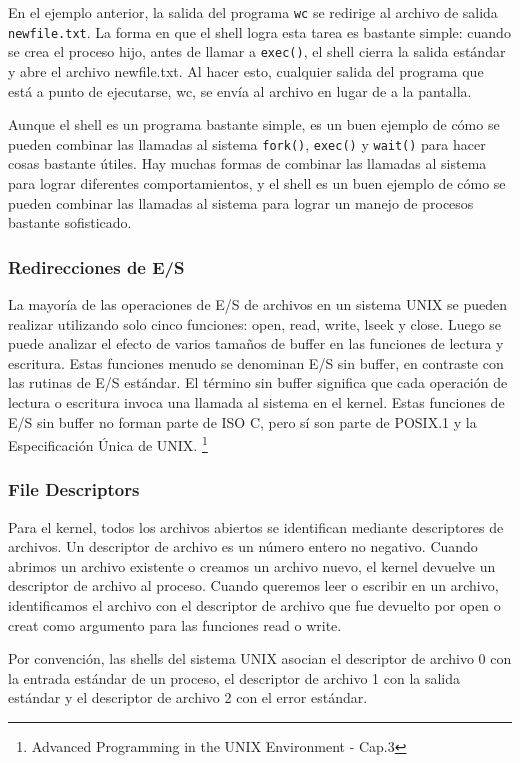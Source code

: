 \documentclass{article}
\begin{document}
En el ejemplo anterior, la salida del programa \texttt{wc} se redirige al archivo de salida \texttt{newfile.txt}. La forma en que el shell logra esta tarea es bastante simple: cuando se crea el proceso hijo, antes de llamar a \texttt{exec()}, el shell cierra la salida estándar y abre el archivo newfile.txt. Al hacer esto, cualquier salida del programa que está a punto de ejecutarse, wc, se envía al archivo en lugar de a la pantalla.

Aunque el shell es un programa bastante simple, es un buen ejemplo de cómo se pueden combinar las llamadas al sistema \texttt{fork()}, \texttt{exec()} y \texttt{wait()} para hacer cosas bastante útiles. Hay muchas formas de combinar las llamadas al sistema para lograr diferentes comportamientos, y el shell es un buen ejemplo de cómo se pueden combinar las llamadas al sistema para lograr un manejo de procesos bastante sofisticado.

\subsubsection{Redirecciones de E/S}
La mayoría de las operaciones de E/S de archivos en un sistema UNIX se pueden realizar utilizando solo cinco funciones: open, read, write, lseek y close. Luego se puede analizar el efecto de varios tamaños de buffer en las funciones de lectura y escritura. Estas funciones menudo se denominan E/S sin buffer, en contraste con las rutinas de E/S estándar. El término sin buffer significa que cada operación de lectura o escritura invoca una llamada al sistema en el kernel. Estas funciones de E/S sin buffer no forman parte de ISO C, pero sí son parte de POSIX.1 y la Especificación Única de UNIX. \footnote{Advanced Programming in the UNIX Environment - Cap.3}

\subsubsection{File Descriptors}
Para el kernel, todos los archivos abiertos se identifican mediante descriptores de archivos. Un descriptor de archivo es un número entero no negativo. Cuando abrimos un archivo existente o creamos un archivo nuevo, el kernel devuelve un descriptor de archivo al proceso. Cuando queremos leer o escribir en un archivo, identificamos el archivo con el descriptor de archivo que fue devuelto por open o creat como argumento para las funciones read o write.

Por convención, las shells del sistema UNIX asocian el descriptor de archivo 0 con la entrada estándar de un proceso, el descriptor de archivo 1 con la salida estándar y el descriptor de archivo 2 con el error estándar. 
\end{document}

